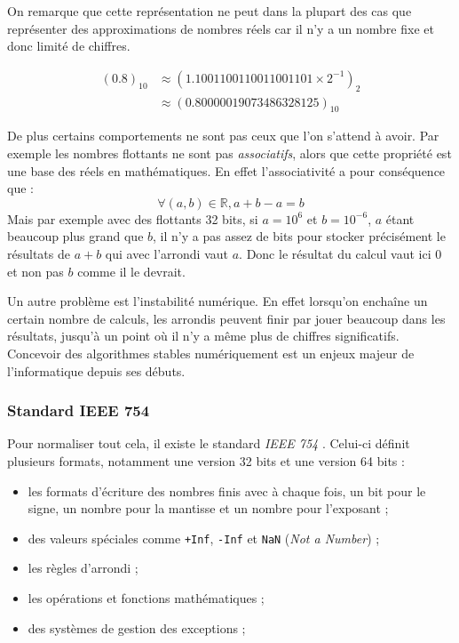 \documentclass[a4paper,11pt]{report}
\begin{document}
On remarque que cette représentation ne peut dans la plupart des cas que représenter des approximations de nombres réels car il n'y a un nombre fixe et donc limité de chiffres.

\begin{displaymath}
    \begin{split}
        (0.8)_{10} & \approx (1.1001100110011001101 \times 2^{-1})_{2} \\
        & \approx (0.80000019073486328125)_{10}
    \end{split}
\end{displaymath}

De plus certains comportements ne sont pas ceux que l'on s'attend à avoir.
Par exemple les nombres flottants ne sont pas \emph{associatifs}, alors que cette propriété est une base des réels en mathématiques.
En effet l'associativité a pour conséquence que :
$$\forall (a, b) \in \mathbb{R}, a+b-a=b$$
Mais par exemple avec des flottants 32 bits, si $a=10^{6}$ et $b=10^{-6}$, $a$ étant beaucoup plus grand que $b$,
il n'y a pas assez de bits pour stocker précisément le résultats de $a+b$ qui avec l'arrondi vaut $a$.
Donc le résultat du calcul vaut ici $0$ et non pas $b$ comme il le devrait.

Un autre problème est l'instabilité numérique.
En effet lorsqu'on enchaîne un certain nombre de calculs, les arrondis peuvent finir par jouer beaucoup dans les résultats, jusqu'à un point où il n'y a même plus de chiffres significatifs.
Concevoir des algorithmes stables numériquement est un enjeux majeur de l'informatique depuis ses débuts.

\subsubsection{Standard IEEE 754}

Pour normaliser tout cela, il existe le standard \emph{IEEE 754} \cite{8766229}.
Celui-ci définit plusieurs formats, notamment une version 32 bits et une version 64 bits :
\begin{itemize}
    \item les formats d'écriture des nombres finis avec à chaque fois, un bit pour le signe, un nombre pour la mantisse et un nombre pour l'exposant ;
    \item des valeurs spéciales comme \verb'+Inf', \verb'-Inf' et \verb'NaN' (\emph{Not a Number}) ;
    \item les règles d'arrondi ;
    \item les opérations et fonctions mathématiques ;
    \item des systèmes de gestion des exceptions ;
\end{itemize}
\end{document}
